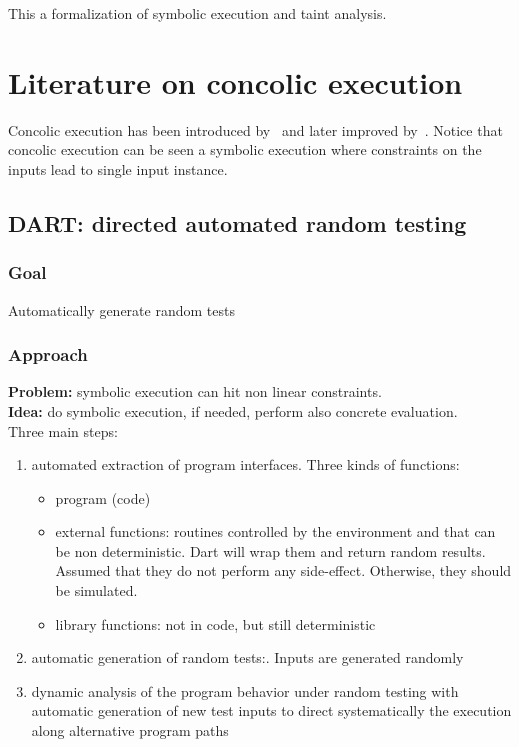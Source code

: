 \documentclass[10pt, a4paper]{article}
\begin{document}
This a formalization of symbolic execution and taint analysis.

\section{Literature on concolic execution}

Concolic execution has been introduced by~\cite{DART-PLDI05} and later improved by~\cite{CUTE-FSE13}. Notice that concolic execution can be seen a symbolic execution where constraints on the inputs lead to single input instance.

\subsection{\cite{DART-PLDI05} DART: directed automated random testing}

\subsubsection{Goal}

Automatically generate random tests

\subsubsection{Approach}

{\bf Problem:} symbolic execution can hit non linear constraints.\\
{\bf Idea:} do symbolic execution, if needed, perform also concrete evaluation.\\


Three main steps:
\begin{enumerate}
  \item automated extraction of program interfaces. Three kinds of functions:
    \begin{itemize}
      \item program (code)
      \item external functions: routines controlled by the environment and that can be non deterministic. Dart will wrap them and return random results. Assumed that they do not perform any side-effect. Otherwise, they should be simulated.
      \item library functions: not in code, but still deterministic
    \end{itemize}
  \item automatic generation of random tests:. Inputs are generated randomly
  \item dynamic analysis of the program behavior under random testing with automatic generation of new test inputs to direct systematically the execution along alternative program paths
\end{enumerate}
\end{document}

